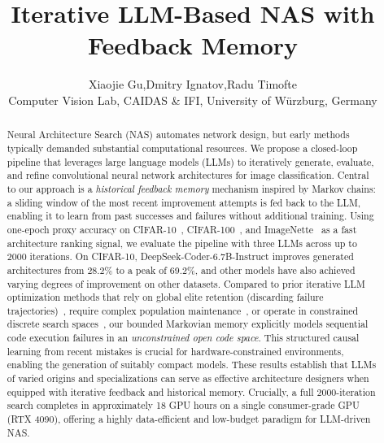 \documentclass[10pt,twocolumn,letterpaper]{article}
\begin{document}
	
	\title{Iterative LLM-Based NAS with Feedback Memory}
	
	\author{Xiaojie Gu,\space\space\space Dmitry Ignatov,\space\space\space Radu Timofte\\
		\small{Computer Vision Lab, CAIDAS \& IFI, University of W\"urzburg, Germany}}
	\maketitle
	
	
	\begin{abstract}
		Neural Architecture Search (NAS) automates network design, but early methods typically demanded substantial computational resources. We propose a closed-loop pipeline that leverages large language models (LLMs) to iteratively generate, evaluate, and refine convolutional neural network architectures for image classification. Central to our approach is a \emph{historical feedback memory} mechanism inspired by Markov chains: a sliding window of the most recent improvement attempts is fed back to the LLM, enabling it to learn from past successes and failures without additional training. Using one-epoch proxy accuracy on CIFAR-10~\cite{Krizhevsky2009}, CIFAR-100~\cite{Krizhevsky2009}, and ImageNette~\cite{imagenette} as a fast architecture ranking signal, we evaluate the pipeline with three LLMs across up to 2000 iterations. On CIFAR-10, DeepSeek-Coder-6.7B-Instruct improves generated architectures from 28.2\% to a peak of 69.2\%, and other models have also achieved varying degrees of improvement on other datasets. Compared to prior iterative LLM optimization methods that rely on global elite retention (discarding failure trajectories)~\cite{Yang2023OPRO,Romera2023FunSearch}, require complex population maintenance~\cite{Chen2023EvoPrompting}, or operate in constrained discrete search spaces~\cite{Zhong2024LLMO}, our bounded Markovian memory explicitly models sequential code execution failures in an \emph{unconstrained open code space}. This structured causal learning from recent mistakes is crucial for hardware-constrained environments, enabling the generation of suitably compact models. These results establish that LLMs of varied origins and specializations can serve as effective architecture designers when equipped with iterative feedback and historical memory. Crucially, a full 2000-iteration search completes in approximately 18 GPU hours on a single consumer-grade GPU (RTX 4090), offering a highly data-efficient and low-budget paradigm for LLM-driven NAS.
	\end{abstract}
	
\end{document}
